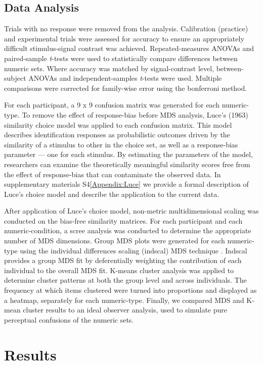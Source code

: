 \subsection{Data Analysis}
Trials with no response were removed from the analysis. Calibration (practice) and experimental trials were assessed for accuracy to ensure an appropriately difficult stimulus-signal contrast was achieved. Repeated-measures ANOVAs and paired-sample \textit{t}-tests were used to statistically compare differences between numeric sets. Where accuracy was matched by signal-contrast level, between-subject ANOVAs and independent-samples \textit{t}-tests were used. Multiple comparisons were corrected for family-wise error using the bonferroni method.

For each participant, a 9 x 9 confusion matrix was generated for each numeric-type. To remove the effect of response-bias before MDS analysis, Luce's (1963) similarity choice model was applied to each confusion matrix. This model describes identification responses as probabilistic outcomes driven by the similarity of a stimulus to other in the choice set, as well as a response-bias parameter --- one for each stimulus. By estimating the parameters of the model, researchers can examine the theoretically meaningful similarity scores free from the effect of response-bias that can contaminate the observed data. In supplementary materials S4\ref{Appendix:Luce} we provide a formal description of Luce's choice model and describe the application to the current data. 

After application of Luce's choice model, non-metric multidimensional scaling was conducted on the bias-free similarity matrices. For each participant and each numeric-condition, a scree analysis was conducted to determine the appropriate number of MDS dimensions. Group MDS plots were generated for each numeric-type using the individual differences scaling (indscal) MDS technique \cite{carroll1970indscal}. Indscal provides a group MDS fit by deferentially weighting the contribution of each individual to the overall MDS fit. K-means cluster analysis was applied to determine cluster patterns at both the group level and across individuals. The frequency at which items clustered were turned into proportions and displayed as a heatmap, separately for each numeric-type. Finally, we compared MDS and K-mean cluster results to an ideal observer analysis, used to simulate pure perceptual confusions of the numeric sets.

\section{Results}
